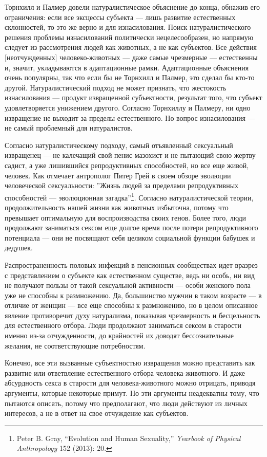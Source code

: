 \documentclass[12pt]{book}
\begin{document}
Торнхилл и Палмер довели натуралистическое объяснение до конца, обнажив его ограничения: если все эксцессы субъекта --- лишь развитие естественных склонностей, то это же верно и для изнасилования. Поиск натуралистического решения проблемы изнасилований политически нецелесообразен, но напрямую следует из рассмотрения людей как животных, а не как субъектов. Все действия [неотчужденных] человеко-животных --- даже самые чрезмерные --- естественны и, значит, укладываются в адаптационные рамки. Адаптационные объяснения очень популярны, так что если бы не Торнхилл и Палмер, это сделал бы кто-то другой. Натуралистический подход не может признать, что жестокость изнасилования --- продукт извращенной субъектности, результат того, что субъект удовлетворяется унижением другого. Согласно Торнхиллу и Палмеру, ни одно извращение не выходит за пределы естественного. Но вопрос изнасилования --- не самый проблемный для натуралистов.

Согласно натуралистическому подходу, самый отъявленный сексуальный извращенец --- не калечащий свой пенис мазохист и не пытающий свою жертву садист, а уже лишившийся репродуктивных способностей, но все еще живой, человек. Как отмечает антрополог Питер Грей в своем обзоре эволюции человеческой сексуальности: ''Жизнь людей за пределами репродуктивных способностей --- эволюционная загадка''\footnote{Peter B. Gray, “Evolution and Human Sexuality,” \textit{Yearbook of Physical Anthropology} 152 (2013): 20.}. Согласно натуралистической теории, продолжительность нашей жизни как животных избыточна, потому что превышает оптимальную для воспроизводства своих генов. Более того, люди продолжают заниматься сексом еще долгое время после потери репродуктивного потенциала --- они не посвящают себя целиком социальной функции бабушек и дедушек.

Распространенность половых инфекций в пенсионных сообществах идет вразрез с представлением о субъекте как естественном существе, ведь ни особь, ни вид не получают пользы от такой сексуальной активности --- особи женского пола уже не способны к размножению. Да, большинство мужчин в таком возрасте --- в отличие от женщин --- все еще способны к размножению, но в целом описанное явление противоречит духу натурализма, показывая чрезмерность и бесцельность для естественного отбора. Люди продолжают заниматься сексом в старости именно из-за отчужденности, до крайностей их доводят бессознательные желания, не соответствующие потребностям.

Конечно, все эти вызванные субъектностью извращения можно представить как развитие или ответвление естественного отбора человека-животного. И даже абсурдность секса в старости для человека-животного можно отрицать, приводя аргументы, которые некоторые примут. Но эти аргументы неадекватны тому, что пытаются описать, потому что предполагают, что люди действуют из личных интересов, а не в ответ на свое отчуждение как субъектов.
\end{document}
